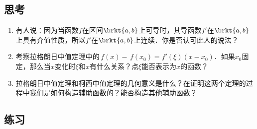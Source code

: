 \documentclass[a4paper,punct=CCT]{ctexbook}
\theoremstyle{definition}
\theoremstyle{remark}
\newif\ifshowex
\newif\ifshowsolp
\let\leq\leqslant
\let\le\leq
\begin{document}
\subsection*{思考}

\begin{enumerate}
\item 有人说：因为当函数\(f\)在区间\(\brkt{a,b}\)上可导时，其导函数\(f'\)在\(\brkt{a,b}\)上具有介值性质，所以\(f'\)在\(\brkt{a,b}\)上连续．你是否认可此人的说法？

  \ifshowsolp
  不认可．练习~\ref{B1.4.1.E}题~\ref{B1.4.1.E4}中的函数就是一个反例．
  \fi

\item 考察拉格朗日中值定理中的\(\,f(x) - \,f(x_0) = f'(\xi)(x - x_0)\)．如果\(x_0\)固定，那么当\(x\)变化时\(\xi\)和\(x\)有什么关系？点\(\xi\)能否表示为\(x\)的函数？

  \ifshowsolp
  点\(\xi\)一定坐落在\(x_0\)与\(x\)之间．可以，但这个函数并不唯一，只能说明至少存在一个这样的函数．举个极端点的例子，对于恒等函数\(\,f(x) = x\)来说，任意的\(\minb{x_0, x} \le \xi \le \maxb{x_0, x}\)都能是某个这样函数的函数值．
  \fi

\item 拉格朗日中值定理和柯西中值定理的几何意义是什么？在证明这两个定理的过程中我们是如何构造辅助函数的？能否构造其他辅助函数？

  \ifshowsolp
  可以构造其他辅助函数．
  \fi
\end{enumerate}

\ifshowex
{}
\subsection*{练习}
\end{document}
